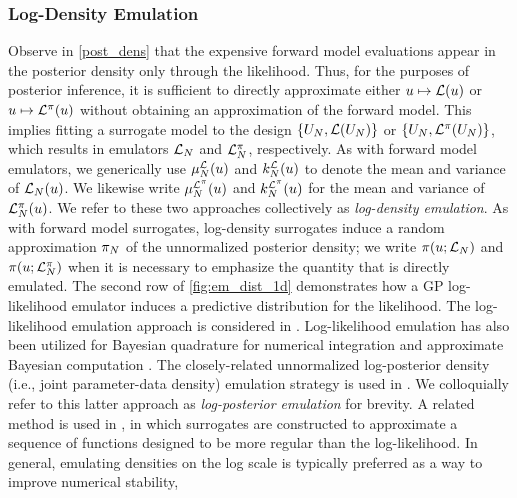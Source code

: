 \documentclass[12pt]{article}
\begin{document}
\subsubsection{Log-Density Emulation} \label{log_density_emulation}
Observe in \cref{post_dens} that the expensive forward model evaluations appear in the posterior density only through the 
likelihood. Thus, for the purposes of posterior inference, it is sufficient to directly approximate either
$\Par \mapsto \llik(\Par)$ or $\Par \mapsto \lpost(\Par)$ without obtaining an approximation of the forward model.
This implies fitting a surrogate model to the design $\{\designIn, \llik(\designIn)\}$ or $\{\designIn, \lpost(\designIn)\}$,
which results in emulators $\llikEm[\Ndesign]$ and $\lpostEm[\Ndesign]$, respectively.
As with forward model emulators, we generically use $\emMean[\Ndesign]{\llik}(\Par)$ and $\emKer[\Ndesign]{\llik}(\Par)$ 
to denote the mean and variance of $\llikEm[\Ndesign](\Par)$. We likewise write $\emMean[\Ndesign]{\lpost}(\Par)$ and 
$\emKer[\Ndesign]{\lpost}(\Par)$ for the mean and variance of $\lpostEm[\Ndesign](\Par)$.
We refer to these two approaches collectively as \textit{log-density emulation}.
As with forward model surrogates, log-density surrogates induce a random approximation $\postEm[\Ndesign]$ of the 
unnormalized posterior density; we write $\postDens(\Par; \llikEm[\Ndesign])$ and $\postDens(\Par; \lpostEm[\Ndesign])$
when it is necessary to emphasize the quantity that is directly emulated.
The second row of \cref{fig:em_dist_1d} demonstrates how a GP log-likelihood emulator induces a predictive 
distribution for the likelihood.
The log-likelihood emulation approach is considered in 
\citet{VehtariParallelGP,FATES_CES,trainDynamics,quantileApprox,ActiveLearningMCMC,FerEmulation,
StuartTeck1,random_fwd_models,GP_PDE_priors,OakleyllikEm}.
Log-likelihood emulation has also been utilized for Bayesian quadrature for numerical 
integration \citep{BayesQuadrature,BayesQuadRatios} and approximate Bayesian 
computation \citep{llikEmABC}.
The closely-related unnormalized log-posterior density (i.e., joint parameter-data density) emulation
strategy is used in \citet{emPostDens,Kandasamy_2017,llikRBF,gp_surrogates_random_exploration,landslideCalibration}.
We colloquially refer to this latter approach as \textit{log-posterior emulation} for brevity.
A related method is used in \citep{wang2018adaptive,adaptiveMultimodal}, in which surrogates are constructed 
to approximate a sequence of functions designed to be more regular than the log-likelihood.   
In general, emulating densities on the log scale is typically preferred as a way to improve numerical stability,
\end{document}
